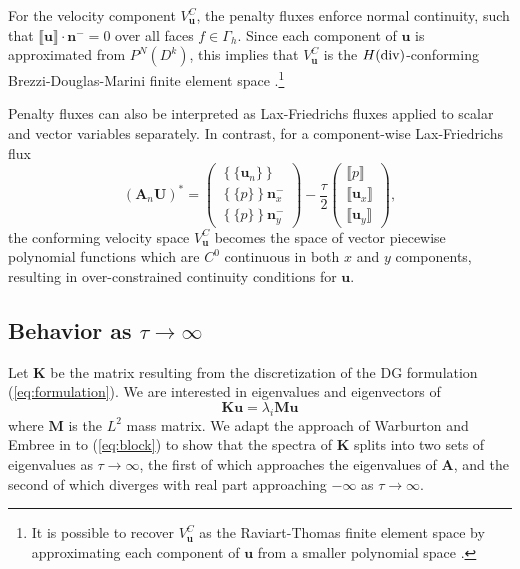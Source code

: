 \documentclass[10pt]{article}
\newcommand{\LRc}[1]{\left\{ #1 \right\}}
\newcommand{\jump}[1] {\ensuremath{\llbracket#1\rrbracket}}
\newcommand{\avg}[1] {\ensuremath{\LRc{\!\{#1\}\!}}}
\newcommand{\Gh}{\Gamma_h}
\begin{document}
For the velocity component $V_{\bm{u}}^C$, the penalty fluxes enforce normal continuity, such that $\jump{\bm{u}}\cdot \bm{n}^- = 0$ over all faces $f \in \Gh$.  Since each component of $\bm{u}$ is approximated from $P^N(D^k)$, this implies that $V^C_{\bm{u}}$ is the $H({\rm div})$-conforming Brezzi-Douglas-Marini finite element space \cite{brezzi1985two,boffi2013mixed}.\footnote{It is possible to recover $V^C_{\bm{u}}$ as the Raviart-Thomas finite element space by approximating each component of $\bm{u}$ from a smaller polynomial space \cite{kirby2004algorithm}.}  

Penalty fluxes can also be interpreted as Lax-Friedrichs fluxes applied to scalar and vector variables separately.  In contrast, for a component-wise Lax-Friedrichs flux 
\[
(\bm{A}_n\bm{U})^* = \left(\begin{array}{c}
\avg{\bm{u}_n}\\
\avg{p }\bm{n}^-_x\\
\avg{p }\bm{n}^-_y
\end{array}
\right) - 
\frac{\tau}{2}\left(\begin{array}{c}
\jump{p}\\
\jump{\bm{u}_x}\\
\jump{\bm{u}_y}
\end{array}
\right),
\]
the conforming velocity space $V^C_{\bm{u}}$ becomes the space of vector piecewise polynomial functions which are $C^0$ continuous in both $x$ and $y$ components, resulting in over-constrained continuity conditions for $\bm{u}$.  

\subsection{Behavior as $\tau\rightarrow\infty$}

Let $\bm{K}$ be the matrix resulting from the discretization of the DG formulation (\ref{eq:formulation}).  We are interested in eigenvalues and eigenvectors of 
\[
\bm{K}\bm{u} = \lambda_i\bm{M}\bm{u}
\]
where $\bm{M}$ is the $L^2$ mass matrix.  We adapt the approach of Warburton and Embree in \cite{Warburton20063205} to (\ref{eq:block}) to show that the spectra of $\bm{K}$ splits into two sets of eigenvalues as $\tau\rightarrow \infty$, the first of which approaches the eigenvalues of $\bm{A}$, and the second of which diverges with real part approaching $-\infty$ as $\tau\rightarrow \infty$.  
\end{document}
